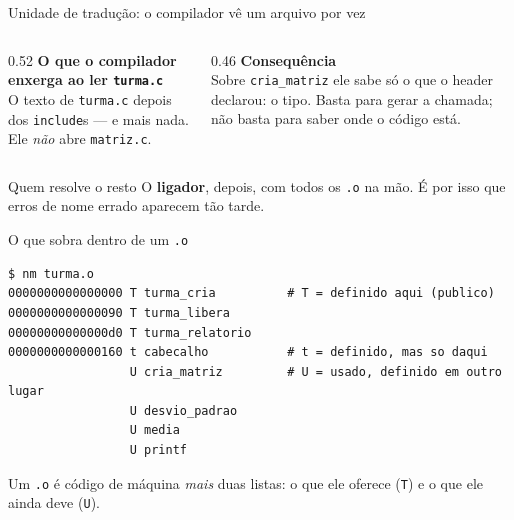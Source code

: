 \documentclass[aspectratio=169]{beamer}
\begin{document}
\begin{frame}{Unidade de tradução: o compilador vê um arquivo por vez}
  \begin{columns}[T]
    \begin{column}{0.52\textwidth}
      \textbf{O que o compilador enxerga ao ler \texttt{turma.c}}\\[0.3em]
      \small O texto de \texttt{turma.c} depois dos \texttt{include}s --- e
      mais nada. Ele \emph{não} abre \texttt{matriz.c}.
    \end{column}
    \begin{column}{0.46\textwidth}
      \textbf{Consequência}\\[0.3em]
      \small Sobre \texttt{cria\_matriz} ele sabe só o que o header declarou:
      o tipo. Basta para gerar a chamada; não basta para saber onde o código
      está.
    \end{column}
  \end{columns}
  \begin{block}{Quem resolve o resto}
    O \textbf{ligador}, depois, com todos os \texttt{.o} na mão. É por isso
    que erros de nome errado aparecem tão tarde.
  \end{block}
\end{frame}

\begin{frame}[fragile]{O que sobra dentro de um \texttt{.o}}
\begin{lstlisting}[style=shellStyle]
$ nm turma.o
0000000000000000 T turma_cria          # T = definido aqui (publico)
0000000000000090 T turma_libera
00000000000000d0 T turma_relatorio
0000000000000160 t cabecalho           # t = definido, mas so daqui
                 U cria_matriz         # U = usado, definido em outro lugar
                 U desvio_padrao
                 U media
                 U printf
\end{lstlisting}
  \begin{block}{}
    \small Um \texttt{.o} é código de máquina \emph{mais} duas listas: o que
    ele oferece (\texttt{T}) e o que ele ainda deve (\texttt{U}).
  \end{block}
\end{frame}
\end{document}
